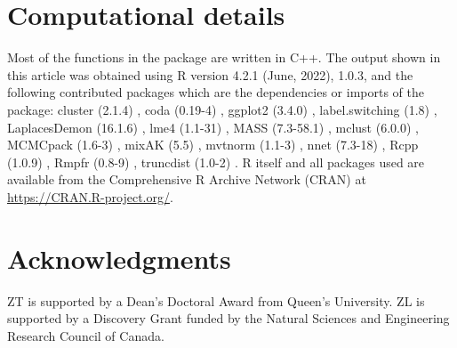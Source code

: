 \section*{Computational details}
Most of the functions in the  package are written in C++. The output shown in this article was obtained using R version 4.2.1 (June, 2022),  1.0.3, and the following contributed packages which are the dependencies or imports of the  package: cluster (2.1.4) \citep{Maechler2022}, coda (0.19-4) \citep{Martyn2006}, ggplot2 (3.4.0) \citep{Wickham2016}, label.switching (1.8) \citep{Papastamoulis2016}, LaplacesDemon (16.1.6) \citep{Hall2022}, lme4 (1.1-31) \citep{Bates2015}, MASS (7.3-58.1) \citep{Ripley2013}, mclust (6.0.0) \citep{Fraley2006}, MCMCpack (1.6-3) \citep{Martin2011}, mixAK (5.5) \citep{Komarek2014}, mvtnorm (1.1-3) \citep{Genz2021}, nnet (7.3-18) \citep{Ripley2016}, Rcpp (1.0.9) \citep{Eddelbuettel2011}, Rmpfr (0.8-9) \citep{Maechler2022a}, truncdist (1.0-2) \citep{Novomestky2016}. R itself and all packages used are available from the Comprehensive R Archive Network (CRAN) at \url{https://CRAN.R-project.org/}.
\section*{Acknowledgments}
ZT is supported by a Dean’s Doctoral Award from Queen’s University. ZL is supported by a Discovery Grant funded by the Natural Sciences and Engineering Research Council of Canada.

\address{Zhiwen Tan\\
  Department of Public Health Sciences\\
  Queen's University}
\address{Chang Shen\\
  Department of Electrical and Computer Engineering\\
  Queen's University}
\address{Zihang Lu\\
  Department of Public Health Sciences\\
  \emph{and} Department of Mathematics and Statistics\\
  Queen's University\\
  }

